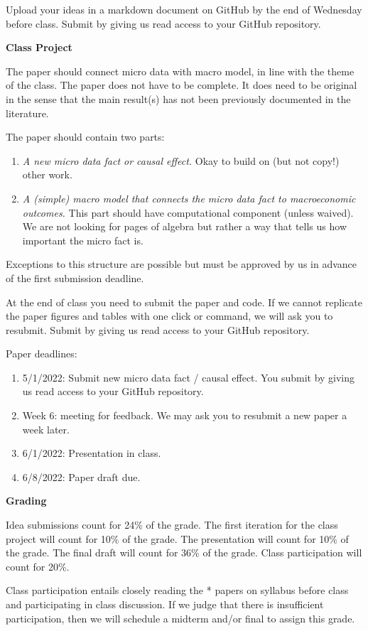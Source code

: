 \documentclass [12pt]{article}
\begin{document}
Upload your ideas in a markdown document on GitHub by the end of Wednesday before class. Submit by giving us read access to your GitHub repository.

\noindent  \textbf{Class Project}

The paper should connect micro data with macro model, in line with the theme of the class. The paper does not have to be complete. It does need to be original in the sense that the main result(s) has not been previously documented in the literature.

The paper should contain two parts:
\begin{enumerate}
	\item \emph{A new micro data fact or causal effect.} Okay to build on (but not copy!) other work.
	\item \emph{A (simple) macro model that connects the micro data fact to macroeconomic outcomes.}  This part should have computational component (unless waived). We are not looking for pages of algebra but rather a way that tells us how important the micro fact is.
\end{enumerate}
Exceptions to this structure are possible but must be approved by us in advance of the first submission deadline.

At the end of class you need to submit the paper and code. If we cannot replicate the paper figures and tables with one click or command, we will ask you to resubmit. Submit by giving us read access to your GitHub repository.

Paper deadlines:
\begin{enumerate}
	\item 5/1/2022: Submit new micro data fact / causal effect.  You submit by giving us read access to your GitHub repository.
	\item Week 6: meeting for feedback. We may ask you to resubmit a new paper a week later.
	\item 6/1/2022: Presentation in class.
	\item 6/8/2022: Paper draft due.
\end{enumerate}


\noindent  \textbf{Grading}

\noindent Idea submissions count for 24\% of the grade. The first iteration for the class project will count for 10\% of the grade. The presentation will count for 10\% of the grade. The final draft will count for 36\% of the grade. Class participation will count for 20\%.

Class participation entails closely reading the * papers on syllabus before class and participating in class discussion. If we judge that there is insufficient participation, then we will schedule a midterm and/or final to assign this grade.
\end{document}
